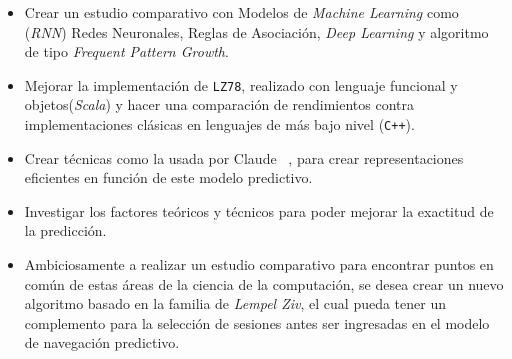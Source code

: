 \begin{itemize}

\item Crear un estudio comparativo con Modelos de \emph{Machine Learning} como (\emph{RNN}) Redes Neuronales, Reglas de Asociación, \emph{Deep Learning} y algoritmo de tipo \emph{Frequent Pattern Growth}.

\item Mejorar la implementación de \texttt{LZ78}, realizado con lenguaje funcional y objetos(\emph{Scala}) y hacer una comparación de rendimientos contra implementaciones clásicas en lenguajes de más bajo nivel (\texttt{C++}).


\item Crear técnicas como la usada por Claude \etal~\cite{Claude2014}, para crear representaciones eficientes en función de este modelo predictivo.


\item Investigar los factores teóricos y técnicos para poder mejorar la exactitud de la predicción.

\item Ambiciosamente a realizar un estudio comparativo para encontrar puntos en común de estas áreas de la ciencia de la computación, se desea crear un nuevo algoritmo basado en la familia de \emph{Lempel Ziv}, el cual pueda tener un complemento para la selección de sesiones antes ser ingresadas en el modelo de navegación predictivo. 


	
\end{itemize}	






 








